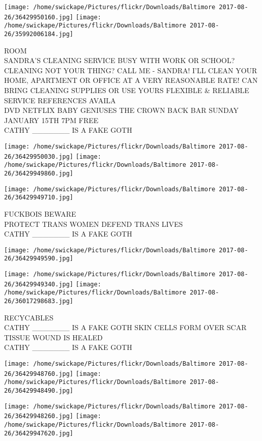 \documentclass[10pt,letterpaper]{article}
\begin{document}
\texttt{[image: /home/swickape/Pictures/flickr/Downloads/Baltimore 2017-08-26/36429950160.jpg]}
\texttt{[image: /home/swickape/Pictures/flickr/Downloads/Baltimore 2017-08-26/35992006184.jpg]}

ROOM\\
SANDRA'S CLEANING SERVICE BUSY WITH WORK OR SCHOOL?  CLEANING NOT YOUR THING?  CALL ME {-} SANDRA!   I'LL CLEAN YOUR HOME, APARTMENT OR OFFICE AT A VERY REASONABLE RATE!  CAN BRING CLEANING SUPPLIES OR USE YOURS FLEXIBLE \& RELIABLE SERVICE REFERENCES AVAILA\\
DVD NETFLIX BABY GENIUSES THE CROWN BACK BAR SUNDAY JANUARY 15TH 7PM FREE\\
CATHY \_\_\_\_\_\_\_ IS A FAKE GOTH
\pagebreak

\texttt{[image: /home/swickape/Pictures/flickr/Downloads/Baltimore 2017-08-26/36429950030.jpg]}
\texttt{[image: /home/swickape/Pictures/flickr/Downloads/Baltimore 2017-08-26/36429949860.jpg]}

\texttt{[image: /home/swickape/Pictures/flickr/Downloads/Baltimore 2017-08-26/36429949710.jpg]}

FUCKBOIS BEWARE\\
PROTECT TRANS WOMEN DEFEND TRANS LIVES\\
CATHY \_\_\_\_\_\_\_ IS A FAKE GOTH
\pagebreak

\texttt{[image: /home/swickape/Pictures/flickr/Downloads/Baltimore 2017-08-26/36429949590.jpg]}

\vspace{0.25in}
\texttt{[image: /home/swickape/Pictures/flickr/Downloads/Baltimore 2017-08-26/36429949340.jpg]}
\texttt{[image: /home/swickape/Pictures/flickr/Downloads/Baltimore 2017-08-26/36017298683.jpg]}

RECYCABLES\\
CATHY \_\_\_\_\_\_\_ IS A FAKE GOTH SKIN CELLS FORM OVER SCAR TISSUE WOUND IS HEALED\\
CATHY \_\_\_\_\_\_\_ IS A FAKE GOTH
\pagebreak

\texttt{[image: /home/swickape/Pictures/flickr/Downloads/Baltimore 2017-08-26/36429948760.jpg]}
\texttt{[image: /home/swickape/Pictures/flickr/Downloads/Baltimore 2017-08-26/36429948490.jpg]}

\texttt{[image: /home/swickape/Pictures/flickr/Downloads/Baltimore 2017-08-26/36429948260.jpg]}
\texttt{[image: /home/swickape/Pictures/flickr/Downloads/Baltimore 2017-08-26/36429947620.jpg]}
\end{document}
